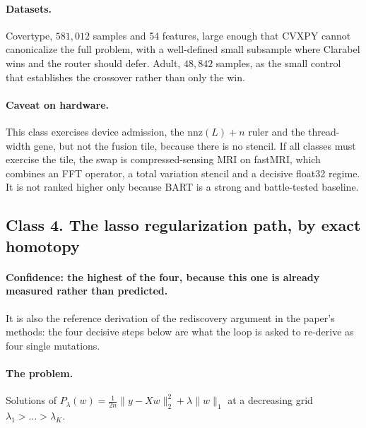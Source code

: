 \documentclass[11pt]{article}
\begin{document}
\paragraph{Datasets.} Covertype, $581{,}012$ samples and 54 features, large
enough that CVXPY cannot canonicalize the full problem, with a well-defined
small subsample where Clarabel wins and the router should defer. Adult,
$48{,}842$ samples, as the small control that establishes the crossover rather
than only the win.

\paragraph{Caveat on hardware.} This class exercises device admission, the
$\mathrm{nnz}(L) + n$ ruler and the thread-width gene, but not the fusion tile,
because there is no stencil. If all classes must exercise the tile, the swap is
compressed-sensing MRI on fastMRI, which combines an FFT operator, a total
variation stencil and a decisive float32 regime. It is not ranked higher only
because BART is a strong and battle-tested baseline.

\subsection{Class 4. The lasso regularization path, by exact homotopy}

\paragraph{Confidence: the highest of the four, because this one is already
measured rather than predicted.} It is also the reference derivation of the
rediscovery argument in the paper's methods: the four decisive steps below are
what the loop is asked to re-derive as four single mutations.

\paragraph{The problem.} Solutions of
$P_\lambda(w) = \tfrac{1}{2n}\|y - Xw\|_2^2 + \lambda\|w\|_1$ at a decreasing
grid $\lambda_1 > \dots > \lambda_K$.
\end{document}
